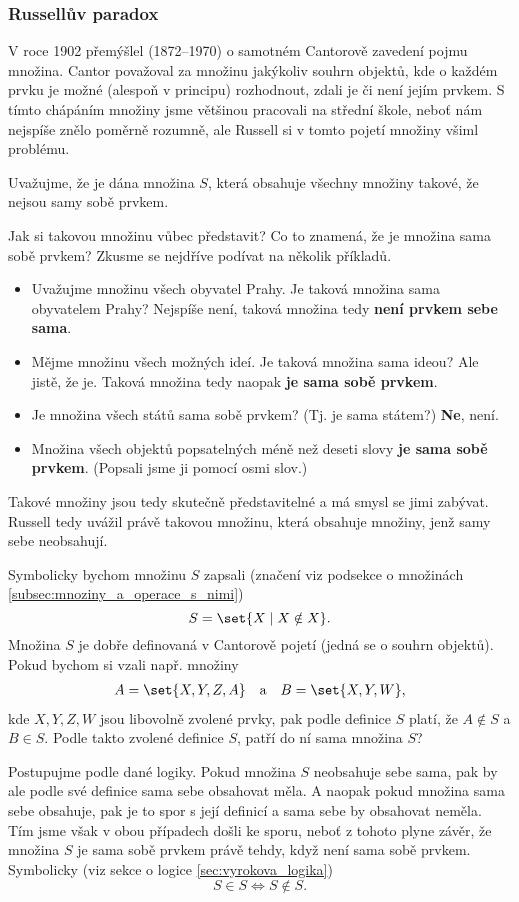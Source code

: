 \subsubsection{Russellův paradox}
V roce 1902 přemýšlel  (1872--1970) o samotném Cantorově zavedení pojmu množina. Cantor považoval za množinu jakýkoliv souhrn objektů, kde o každém prvku je možné (alespoň v principu) rozhodnout, zdali je či není jejím prvkem. S tímto chápáním množiny jsme většinou pracovali na střední škole, neboť nám nejspíše znělo poměrně rozumně, ale Russell si v tomto pojetí množiny všiml problému.\par
Uvažujme, že je dána množina $S$, která obsahuje všechny množiny takové, že nejsou samy sobě prvkem.\par
Jak si takovou množinu vůbec představit? Co to znamená, že je množina sama sobě prvkem? Zkusme se nejdříve podívat na několik příkladů.
\begin{itemize}
    \item Uvažujme množinu všech obyvatel Prahy. Je taková množina sama obyvatelem Prahy? Nejspíše není, taková množina tedy \textbf{není prvkem sebe sama}.
    \item Mějme množinu všech možných ideí. Je taková množina sama ideou? Ale jistě, že je. Taková množina tedy naopak \textbf{je sama sobě prvkem}.
    \item Je množina všech států sama sobě prvkem? (Tj. je sama státem?) \textbf{Ne}, není.
    \item Množina všech objektů popsatelných méně než deseti slovy \textbf{je sama sobě prvkem}. (Popsali jsme ji pomocí osmi slov.)
\end{itemize}
Takové množiny jsou tedy skutečně představitelné a má smysl se jimi zabývat. Russell tedy uvážil právě takovou množinu, která obsahuje množiny, jenž samy sebe neobsahují.

Symbolicky bychom množinu $S$ zapsali (značení viz podsekce o množinách \ref{subsec:mnoziny_a_operace_s_nimi})
\begin{equation*}
S=\set{X \mid X \notin X}.
\end{equation*}
Množina $S$ je dobře definovaná v Cantorově pojetí (jedná se o souhrn objektů). Pokud bychom si vzali např. množiny
\begin{align*}
A=\set{X,Y,Z,A} \quad \text{a} \quad B=\set{X,Y,W},
\end{align*}
kde $X,Y,Z,W$ jsou libovolně zvolené prvky, pak podle definice $S$ platí, že $A \notin S$ a $B \in S$. Podle takto zvolené definice $S$, patří do ní sama množina $S$?\par
Postupujme podle dané logiky. Pokud množina $S$ neobsahuje sebe sama, pak by ale podle své definice sama sebe obsahovat měla. A naopak pokud množina sama sebe obsahuje, pak je to spor s její definicí a sama sebe by obsahovat neměla. Tím jsme však v obou případech došli ke sporu, neboť z tohoto plyne závěr, že množina $S$ je sama sobě prvkem právě tehdy, když není sama sobě prvkem. Symbolicky (viz sekce o logice \ref{sec:vyrokova_logika})
\begin{equation*}
S \in S \iff S \notin S.
\end{equation*}

